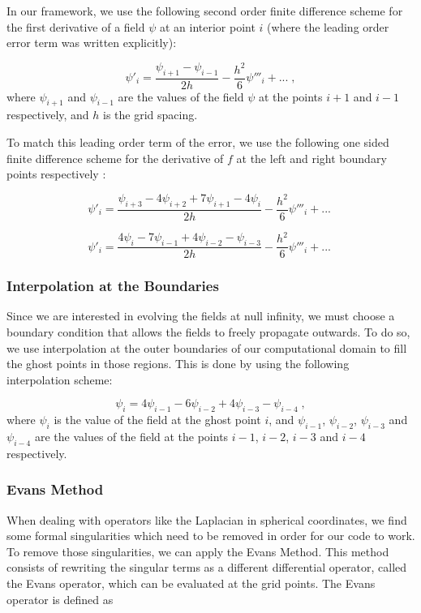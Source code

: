 In our framework, we use the following second order finite difference scheme for the first derivative of a field $\psi$ at an interior point $i$ (where the leading order error term was written explicitly):

\begin{equation}
    \psi'_i = \frac{\psi_{i+1} - \psi_{i-1}}{2h} - \frac{h^2}{6} \psi'''_i + ...\; ,
\end{equation}
%
where $\psi_{i+1}$ and $\psi_{i-1}$ are the values of the field $\psi$ at the points $i+1$ and $i-1$ respectively, and $h$ is the grid spacing.

To match this leading order term of the error, we use the following one sided finite difference scheme for the derivative of $f$ at the left and right boundary points respectively \cite{}:

\begin{equation}
    \psi'_i = \frac{\psi_{i+3} - 4 \psi_{i+2} + 7 \psi_{i+1} - 4 \psi_{i}}{2h} - \frac{h^2}{6} \psi'''_i + ...\;
\end{equation}

\begin{equation}
    \psi'_i = \frac{4 \psi_{i} - 7 \psi_{i-1} + 4 \psi_{i-2} - \psi_{i-3}}{2h} - \frac{h^2}{6} \psi'''_i + ...\;
\end{equation}

\subsubsection{Interpolation at the Boundaries}

Since we are interested in evolving the fields at null infinity, we must choose a boundary condition that allows the fields to freely propagate outwards. To do so, we use interpolation at the outer boundaries of our computational domain to fill the ghost points in those regions. This is done by using the following interpolation scheme:

\begin{equation}
    \psi_i = 4 \psi_{i-1} - 6 \psi_{i-2} + 4 \psi_{i-3} - \psi_{i-4} \; ,
\end{equation}
%
where $\psi_i$ is the value of the field at the ghost point $i$, and $\psi_{i-1}$, $\psi_{i-2}$, $\psi_{i-3}$ and $\psi_{i-4}$ are the values of the field at the points $i-1$, $i-2$, $i-3$ and $i-4$ respectively.

\subsubsection{Evans Method}
When dealing with operators like the Laplacian in spherical coordinates, we find some formal singularities which need to be removed in order for our code to work. To remove those singularities, we can apply the Evans Method. This method consists of rewriting the singular terms as a different differential operator, called the Evans operator, which can be evaluated at the grid points. The Evans operator is defined as

